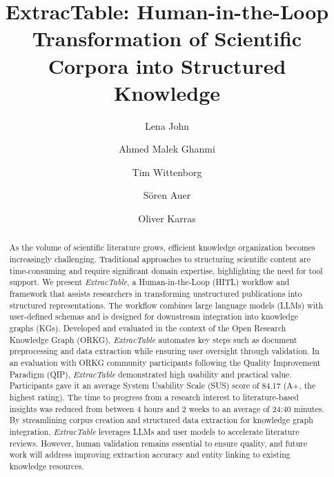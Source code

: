 \documentclass[runningheads]{llncs}
\begin{document}
%
\title{ExtracTable: Human-in-the-Loop Transformation of Scientific Corpora into Structured Knowledge}
%
%
\author{Lena John \and Ahmed Malek Ghanmi \and
Tim Wittenborg \and
Sören Auer \and Oliver Karras }
%
%
%
\maketitle              %
%
\begin{abstract}
As the volume of scientific literature grows, efficient knowledge organization becomes increasingly challenging. Traditional ap\-proach\-es to structuring scientific content are time-consuming and require significant domain expertise, highlighting the need for tool support.
We present \textit{ExtracTable}, a Human-in-the-Loop (HITL) workflow and framework that assists researchers in transforming unstructured publications into structured representations. The workflow combines large language models (LLMs) with user-defined schemas and is designed for downstream integration into knowledge graphs (KGs). Developed and evaluated in the context of the Open Research Knowledge Graph (ORKG), \textit{ExtracTable} automates key steps such as document preprocessing and data extraction while ensuring user oversight through validation.
In an evaluation with ORKG community participants following the Quality Improvement Paradigm (QIP), \textit{ExtracTable} demonstrated high usability and practical value. Participants gave it an average System Usability Scale (SUS) score of 84.17 (A+, the highest rating). The time to progress from a research interest to literature-based insights was reduced from between 4 hours and 2 weeks to an average of 24:40 minutes.
By streamlining corpus creation and structured data extraction for knowledge graph integration, \textit{ExtracTable} leverages LLMs and user models to accelerate literature reviews. However, human validation remains essential to ensure quality, and future work will address improving extraction accuracy and entity linking to existing knowledge resources.


\end{abstract}
\end{document}
